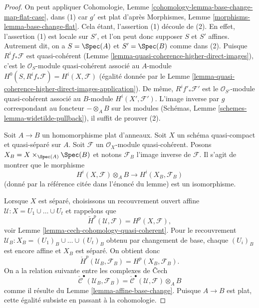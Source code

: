 \begin{proof}
On peut appliquer Cohomologie, Lemme \ref{cohomology-lemma-base-change-map-flat-case}, dans (1)
car $g'$ est plat d'après
Morphismes, Lemme \ref{morphisms-lemma-base-change-flat}.
Cela étant, l'assertion (1) découle de (2). En effet,
l'assertion (1) est locale sur $S'$, et l'on peut donc supposer $S$
et $S'$ affines. Autrement dit, on a $S = \Spec(A)$
et $S' = \Spec(B)$ comme dans (2).
Puisque $R^if_*\mathcal{F}$ est quasi-cohérent
(Lemme \ref{lemma-quasi-coherence-higher-direct-images}),
c'est le $\mathcal{O}_S$-module quasi-cohérent associé au
$A$-module $H^0(S, R^if_*\mathcal{F}) = H^i(X, \mathcal{F})$
(égalité donnée par le
Lemme \ref{lemma-quasi-coherence-higher-direct-images-application}).
De même, $R^if'_*\mathcal{F}'$ est le
$\mathcal{O}_{S'}$-module quasi-cohérent associé au $B$-module
$H^i(X', \mathcal{F}')$. L'image inverse par $g$ correspondant
au foncteur $- \otimes_A B$ sur les modules
(Schémas, Lemme \ref{schemes-lemma-widetilde-pullback}),
il suffit de prouver (2).

\medskip\noindent
Soit $A \to B$ un homomorphisme plat d'anneaux.
Soit $X$ un schéma quasi-compact et quasi-séparé sur $A$.
Soit $\mathcal{F}$ un $\mathcal{O}_X$-module quasi-cohérent.
Posons $X_B = X \times_{\Spec(A)} \Spec(B)$ et notons
$\mathcal{F}_B$ l'image inverse de $\mathcal{F}$.
Il s'agit de montrer que le morphisme
$$
H^i(X, \mathcal{F}) \otimes_A B \longrightarrow H^i(X_B, \mathcal{F}_B)
$$
(donné par la référence citée dans l'énoncé du lemme)
est un isomorphisme.

\medskip\noindent
Lorsque $X$ est séparé, choisissons un recouvrement ouvert affine
$\mathcal{U} : X = U_1 \cup \ldots \cup U_t$ et rappelons que
$$
\check{H}^p(\mathcal{U}, \mathcal{F}) = H^p(X, \mathcal{F}),
$$
voir
Lemme \ref{lemma-cech-cohomology-quasi-coherent}.
Pour le recouvrement $\mathcal{U}_B : X_B = (U_1)_B \cup \ldots \cup (U_t)_B$ obtenu
par changement de base, chaque $(U_i)_B$ est encore affine
et $X_B$ est séparé. On obtient donc
$$
\check{H}^p(\mathcal{U}_B, \mathcal{F}_B) = H^p(X_B, \mathcal{F}_B).
$$
On a la relation suivante entre les complexes de {\v C}ech
$$
\check{\mathcal{C}}^\bullet(\mathcal{U}_B, \mathcal{F}_B) =
\check{\mathcal{C}}^\bullet(\mathcal{U}, \mathcal{F}) \otimes_A B
$$
comme il résulte du
Lemme \ref{lemma-affine-base-change}.
Puisque $A \to B$ est plat, cette égalité subsiste en passant à la cohomologie.


\end{proof}
